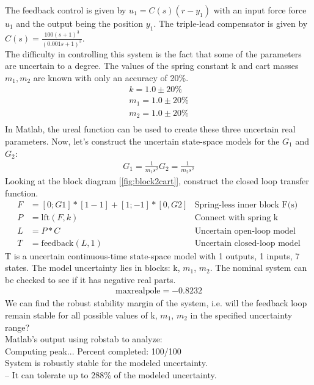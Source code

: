 \documentclass{article}[12pt]
\begin{document}
The feedback control is given by $u_1 = C(s)(r-y_1)$ with an input force force $u_1$ and the output being the position $y_1$. The triple-lead compensator is given by $C(s) = \frac{100(s+1)^3}{(0.001s + 1)^3}$.\\
The difficulty in controlling this system is the fact that some of the parameters are uncertain to a degree. The values of the spring constant k and cart masses $m_1, m_2$ are known with only an accuracy of 20\%.
\begin{align*}
    k = 1.0 \pm 20\%\\
    m_1 = 1.0 \pm 20\%\\
    m_2 = 1.0 \pm 20\%\\
\end{align*}
In Matlab, the ureal function can be used to create these three uncertain real parameters. Now, let's construct the uncertain state-space models for the $G_1$ and $G_2$:
\begin{align*}
    G_1 = \frac{1}{m_1 s^2}
    G_2 = \frac{1}{m_2 s^2}
\end{align*}
Looking at the block diagram [\ref{fig:block2cart}], construct the closed loop transfer function.
\begin{align*}
    F &= [0;G1]*[1 -1]+[1;-1]*[0,G2] & \text{Spring-less inner block F(s)}\\
    P &= \text{lft}(F,k) &\text{Connect with spring k}\\
    L &= P*C & \text{Uncertain open-loop model}\\
    T &= \text{feedback}(L,1) & \text{Uncertain closed-loop model}
\end{align*}
T is a uncertain continuous-time state-space model with 1 outputs, 1 inputs, 7 states. The model uncertainty lies in blocks: k, $m_1$, $m_2$. The nominal system can be checked to see if it has negative real parts.\\
\begin{align*}
    \text{maxrealpole} = -0.8232
\end{align*}
We can find the robust stability margin of the system, i.e. will the feedback loop remain stable for all possible values of k, $m_1$, $m_2$ in the specified uncertainty range?\\
Matlab's output using robstab to analyze:\\
Computing peak...  Percent completed: 100/100\\
System is robustly stable for the modeled uncertainty.\\
 -- It can tolerate up to 288\% of the modeled uncertainty.\\
\end{document}
